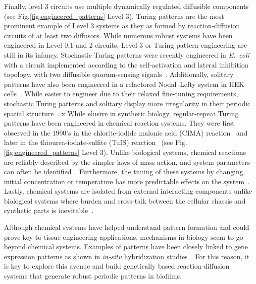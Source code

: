 Finally, level 3 circuits use multiple dynamically regulated diffusible components (see Fig.\ref{fig:engineered_patterns} Level 3).
Turing patterns are the most prominent example of Level 3 systems as they as formed by reaction-diffusion circuits of at least two diffusors.
While numerous robust systems have been engineered in Level 0,1 and 2 circuits, Level 3 or Turing pattern engineering are still in its infancy.
Stochastic Turing patterns were recently engineered in \textit{E.~coli} with a circuit implemented according to the self-activation and lateral inhibition topology, with two diffusible quorum-sensing signals~\parencite{Karig2018}.
Additionally, solitary patterns have also been engineered in a refactored Nodal–Lefty system in HEK cells~\parencite{Sekine2018}.
While easier to engineer due to their relaxed fine-tuning requirements, stochastic Turing patterns and solitary display more irregularity in their periodic spatial structure~\parencite{Butler2011, Karig2018,Sekine2018}.
x
While elusive in synthetic biology, regular-repeat Turing patterns have been engineered in chemical reaction systems.
They were first observed in the 1990's in the chlorite-iodide malonic acid (CIMA) reaction~\parencite{Castets, Lengyel1992} and later in the thiourea-iodate-sulfite (TuIS) reaction~\parencite{Horvath} (see Fig. \ref{fig:engineered_patterns} Level 3).
Unlike biological systems, chemical reactions are reliably described by the simpler laws of mass action, and system parameters can often be identified~\parencite{turanyi1994, kugler2009, Pusnik2019, Yeoh2019}.
Furthermore, the tuning of these systems by changing initial concentration or temperature has more predictable effects on the system~\parencite{Horvath, landeira2010, Asakura2011}.
Lastly, chemical systems are isolated from external interacting components unlike biological systems where burden and cross-talk between the cellular chassis and synthetic parts is inevitable~\parencite{Ceroni2015, Nielsen2016,Butzin2018, Du2020}.


Although chemical systems have helped understand pattern formation and could prove key to tissue engineering applications, mechanisms in biology seem to go beyond chemical systems.
Examples of patterns have been closely linked to gene expression patterns as shown in \textit{in-situ} hybridization studies~\parencite{Jing2006}.
For this reason, it is key to explore this avenue and build genetically based reaction-diffusion systems that generate robust periodic patterns in biofilms.


